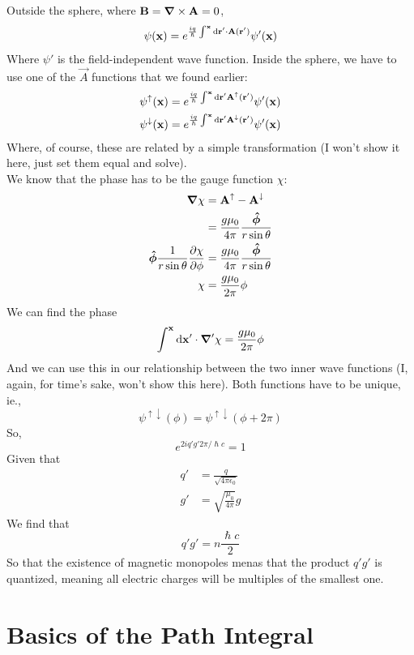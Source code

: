 \documentclass[a4paper]{article}
\begin{document}
Outside the sphere, where $\boldsymbol{\mathbf{B}} = \boldsymbol{\mathbf{\nabla}}\times\boldsymbol{\mathbf{A}} = 0$,
\[
	\psi(\boldsymbol{\mathbf{x}}) =
	e^{\frac{iq}{\hslash}\int^{\boldsymbol{\mathbf{x}}}\mathrm{d}\boldsymbol{\mathbf{r}}'\cdot\boldsymbol{\mathbf{A}}(\boldsymbol{\mathbf{r}}')}
	\psi'(\boldsymbol{\mathbf{x}})
\]
Where $\psi'$ is the field-independent wave function. Inside the sphere, we
have to use one of the $\vec{A}$ functions that we found earlier:
\begin{align*}
	\psi^{\uparrow}(\boldsymbol{\mathbf{x}}) &=
	e^{\frac{iq}{\hslash}
		\int^{\boldsymbol{\mathbf{x}}}\mathrm{d}\boldsymbol{\mathbf{r}}'\boldsymbol{\mathbf{A}}^{\uparrow}(\boldsymbol{\mathbf{r}}')}
	\psi'(\boldsymbol{\mathbf{x}})\\
	\psi^{\downarrow}(\boldsymbol{\mathbf{x}}) &=
	e^{\frac{iq}{\hslash}
		\int^{\boldsymbol{\mathbf{x}}}\mathrm{d}\boldsymbol{\mathbf{r}}'\boldsymbol{\mathbf{A}}^{\downarrow}(\boldsymbol{\mathbf{r}}')}
	\psi'(\boldsymbol{\mathbf{x}})
\end{align*}
Where, of course, these are related by a simple transformation (I won't show it
here, just set them equal and solve).\\
We know that the phase has to be the gauge function $\chi$:
\begin{align*}
	\boldsymbol{\mathbf{\nabla}}\chi &= \boldsymbol{\mathbf{A}}^{\uparrow} - \boldsymbol{\mathbf{A}}^{\downarrow}\\
	&= \frac{g\mu_0}{4\pi}\frac{\boldsymbol{\mathbf{\hat{\phi}}}}{r\sin\theta}\\
	\boldsymbol{\mathbf{\hat{\phi}}}\frac{1}{r\sin\theta}\frac{\partial \chi}{\partial \phi}
	&= \frac{g\mu_0}{4\pi}\frac{\boldsymbol{\mathbf{\hat{\phi}}}}{r\sin\theta}\\
	\chi &= \frac{g\mu_0}{2\pi}\phi
\end{align*}
We can find the phase
\[
	\int^{\boldsymbol{\mathbf{x}}}\mathrm{d}\boldsymbol{\mathbf{x}}'\cdot\boldsymbol{\mathbf{\nabla}}'\chi = \frac{g\mu_0}{2\pi}\phi
\]
And we can use this in our relationship between the two inner wave functions
(I, again, for time's sake, won't show this here). Both functions have to be
unique, ie., 
\[
	\psi^{\uparrow\downarrow}(\phi) = \psi^{\uparrow\downarrow}(\phi+2\pi)
\]
So,
\[
	e^{2iq'g'2\pi/\hslash c} = 1
\]
Given that
\begin{align*}
	q' &= \frac{q}{\sqrt{4\pi\epsilon_0}}\\
	g' &= \sqrt{\frac{\mu_0}{4\pi}}g
\end{align*}
We find that
\[
	q' g' = n\frac{\hslash c}{2}
\]
So that the existence of magnetic monopoles menas that the product $q'g'$ is
quantized, meaning all electric charges will be multiples of the smallest one.


\section{Basics of the Path Integral}
\end{document}
